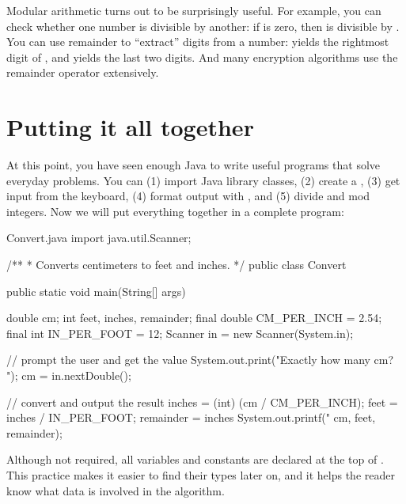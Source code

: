 
Modular arithmetic turns out to be surprisingly useful.
For example, you can check whether one number is divisible by another: if  is zero, then  is divisible by .
You can use remainder to ``extract'' digits from a number:  yields the rightmost digit of , and  yields the last two digits.
And many encryption algorithms use the remainder operator extensively.


\section{Putting it all together}

At this point, you have seen enough Java to write useful programs that solve everyday problems.
You can (1) import Java library classes, (2) create a , (3) get input from the keyboard, (4) format output with , and (5) divide and mod integers.
Now we will put everything together in a complete program:


\begin{trinket}{Convert.java}
import java.util.Scanner;

/**
 * Converts centimeters to feet and inches.
 */
public class Convert {

    public static void main(String[] args) {
        double cm;
        int feet, inches, remainder;
        final double CM_PER_INCH = 2.54;
        final int IN_PER_FOOT = 12;
        Scanner in = new Scanner(System.in);

        // prompt the user and get the value
        System.out.print("Exactly how many cm? ");
        cm = in.nextDouble();

        // convert and output the result
        inches = (int) (cm / CM_PER_INCH);
        feet = inches / IN_PER_FOOT;
        remainder = inches %
        System.out.printf("%
                          cm, feet, remainder);
    }
}
\end{trinket}

Although not required, all variables and constants are declared at the top of .
This practice makes it easier to find their types later on, and it helps the reader know what data is involved in the algorithm.

